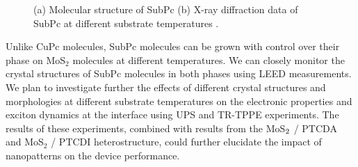 \documentclass[12pt]{article}
\begin{document}
\begin{figure}[H]
\centering
{}\hspace{10pt}
\caption{(a) Molecular structure of SubPc (b) X-ray diffraction data of SubPc at different substrate temperatures \cite{chou2012effect}.}\label{fig:SubPC temp}
\end{figure}
Unlike CuPc molecules, SubPc molecules can be grown with control over their phase on MoS$_2$ molecules at different temperatures. We can closely monitor the crystal structures of SubPc molecules in both phases using LEED measurements. We plan to investigate further the effects of different crystal structures and morphologies at different substrate temperatures on the electronic properties and exciton dynamics at the interface using UPS and TR-TPPE experiments. The results of these experiments, combined with results from the MoS$\protect_2$ / PTCDA and MoS$_2$ / PTCDI heterostructure, could further elucidate the impact of nanopatterns on the device performance.
\end{document}
